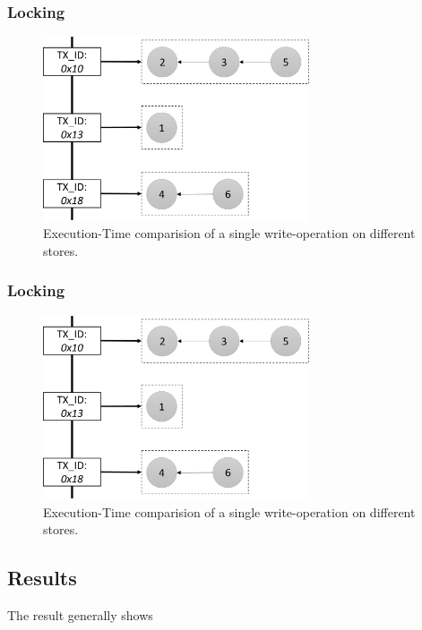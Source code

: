 

\subsubsection{Locking } 
\begin{figure}[t] 
    \centering 
    \includegraphics[width=0.7\textwidth]{Figures/store_comparision.png}
    \caption{Execution-Time comparision of a single write-operation on different stores.}
    \label{fig:store_comparision}
\end{figure}




\subsubsection{Locking } 
\begin{figure}[t] 
    \centering 
    \includegraphics[width=0.7\textwidth]{Figures/store_comparision.png}
    \caption{Execution-Time comparision of a single write-operation on different stores.}
    \label{fig:store_comparision}
\end{figure}



\subsection{Results}
\label{sec:discussion}

The result generally shows



